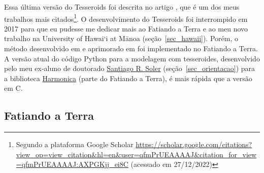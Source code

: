 \documentclass[10pt,a4paper,oneside]{book}
\newcommand{\UHM}{University of Hawai`i at M\={a}noa}
\newcommand{\SantiagoLink}{\href{https://www.santisoler.com/}{Santiago R. Soler}}
\begin{document}
Essa última versão do Tesseroids foi descrita no artigo \citet{Uieda2016}, que
é um dos meus trabalhos mais citados\footnote{Segundo a plataforma Google
Scholar
\url{https://scholar.google.com/citations?view_op=view_citation&hl=en&user=qfmPrUEAAAAJ&citation_for_view=qfmPrUEAAAAJ:AXPGKjj_ei8C}
(acessado em 27/12/2022)}.
O desenvolvimento do Tesseroids foi interrompido em 2017 para que eu pudesse me
dedicar mais ao Fatiando a Terra e ao meu novo trabalho na \UHM{}
(seção~\ref{sec_hawaii}).
Porém, o método desenvolvido em \citet{Uieda2016} e aprimorado em
\citet{Soler2019} foi implementado no Fatiando a Terra.
A versão atual do código Python para a modelagem com tesseroides, desenvolvido
pelo meu ex-aluno de doutorado \SantiagoLink{} (seção~\ref{sec_orientacao})
para a biblioteca \href{https://www.fatiando.org/harmonica/}{Harmonica} (parte
do Fatiando a Terra), é mais rápida que a versão em C.


\subsection{Fatiando a Terra}
\label{sec_fatiando}
\end{document}
